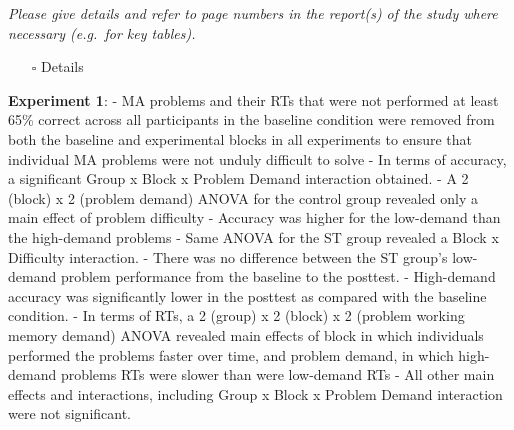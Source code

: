 \documentclass[
  doc, a4paper]{apa7}
\providecommand{\tightlist}{%
  \setlength{\itemsep}{0pt}\setlength{\parskip}{0pt}}
\begin{document}
\emph{Please give details and refer to page numbers in the report(s) of the study where necessary (e.g.~for key tables).}

\begin{itemize}
\tightlist
\item[$\square$]
  Details
\end{itemize}

\textbf{Experiment 1}:
- MA problems and their RTs that were not performed at least 65\% correct across all participants in the baseline condition were removed from both the baseline and experimental blocks in all experiments to ensure that individual MA problems were not unduly difficult to solve
- In terms of accuracy, a significant Group x Block x Problem Demand interaction obtained.
- A 2 (block) x 2 (problem demand) ANOVA for the control group revealed only a main effect of problem difficulty
- Accuracy was higher for the low-demand than the high-demand problems
- Same ANOVA for the ST group revealed a Block x Difficulty interaction.
- There was no difference between the ST group's low-demand problem performance from the baseline to the posttest.
- High-demand accuracy was significantly lower in the posttest as compared with the baseline condition.
- In terms of RTs, a 2 (group) x 2 (block) x 2 (problem working memory demand) ANOVA revealed main effects of block in which individuals performed the problems faster over time, and problem demand, in which high-demand problems RTs were slower than were low-demand RTs
- All other main effects and interactions, including Group x Block x Problem Demand interaction were not significant.
\end{document}
